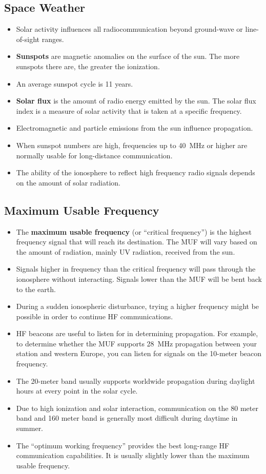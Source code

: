 \documentclass[letterpaper,12pt]{scrartcl}
\begin{document}
\subsection{Space Weather}

\begin{itemize}
  \item Solar activity influences all radiocommunication beyond ground-wave or line-of-sight ranges.
\item \textbf{Sunspots} are magnetic anomalies on the surface of the sun. The more sunspots there are, the greater the ionization.
\item An average sunspot cycle is 11 years.
\item \textbf{Solar flux} is the amount of radio energy emitted by the sun. The solar flux index is a measure of solar activity that is taken at a specific frequency.
\item Electromagnetic and particle emissions from the sun influence propagation.
\item When sunspot numbers are high, frequencies up to 40~MHz or higher are normally usable for long-distance communication.
  \item The ability of the ionosphere to reflect high frequency radio signals depends on the amount of solar radiation.
\end{itemize}

\subsection{Maximum Usable Frequency}

\begin{itemize}
\item The \textbf{maximum usable frequency} (or ``critical frequency'') is the highest frequency signal that will reach its destination. The MUF will vary based on the amount of radiation,
  mainly UV radiation, received from the sun.
\item Signals higher in frequency than the critical frequency will pass through the ionosphere without interacting.
  Signals lower than the MUF will be bent back to the earth.
\item During a sudden ionospheric disturbance, trying a higher frequency might be possible in order to continue HF communications.
\item HF beacons are useful to listen for in determining propagation. For example, to determine whether the MUF supports 28~MHz propagation between your station and western Europe,
  you can listen for signals on the 10-meter beacon frequency.
\item The 20-meter band usually supports worldwide propagation during daylight hours at every point in the solar cycle.
\item Due to high ionization and solar interaction, communication on the 80 meter band and 160 meter band is generally most difficult during daytime in summer.
  \item The ``optimum working frequency'' provides the best long-range HF communication capabilities. It is usually slightly lower than the maximum usable frequency.
\end{itemize}
\end{document}
